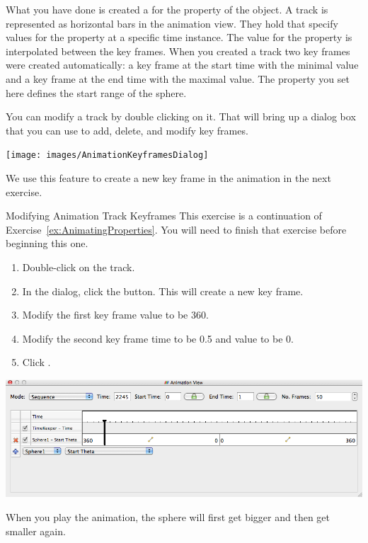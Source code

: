 What you have done is created a  for the 
property of the  object.  A track is represented as horizontal
bars in the animation view.  They hold  that specify
values for the property at a specific time instance.  The value for the
property is interpolated between the key frames.  When you created a track
two key frames were created automatically: a key frame at the start time
with the minimal value and a key frame at the end time with the maximal
value.  The property you set here defines the start range of the sphere.

You can modify a track by double clicking on it.  That will bring up a
dialog box that you can use to add, delete, and modify key frames.

\begin{inlinefig}
  \texttt{[image: images/AnimationKeyframesDialog]}
\end{inlinefig}

We use this feature to create a new key frame in the animation in the next
exercise.

\begin{exercise}{Modifying Animation Track Keyframes}
  \label{ex:ModifyingAnimationTrackKeyframes}%
  This exercise is a continuation of Exercise~\ref{ex:AnimatingProperties}.
  You will need to finish that exercise before beginning this one.

  \begin{enumerate}
  \item Double-click on the  track.
  \item In the  dialog, click the 
    button.  This will create a new key frame.
  \item Modify the first key frame value to be 360.
  \item Modify the second key frame time to be 0.5 and value to be 0.
  \item Click .
  \end{enumerate}

  \begin{inlinefig}
    \includegraphics[width=.9\linewidth]{images/BuildAnimation2}
  \end{inlinefig}

  When you play the animation, the sphere will first get bigger and then get
  smaller again.
\end{exercise}

